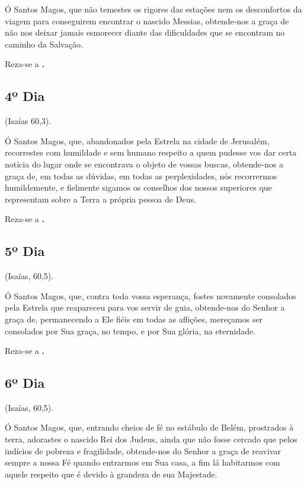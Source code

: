\documentclass[a4paper,14pt]{extarticle} \usepackage[utf8]{inputenc}
\begin{document}

Ó Santos Magos, que não temestes os rigores das estações nem os desconfortos da viagem para conseguirem encontrar o nascido Messias, obtende-nos a graça de não nos deixar jamais esmorecer diante das dificuldades que se encontram no caminho da Salvação.

Reza-se a \textbf{.}


\subsection{4º Dia}

 (Isaías 60,3).

Ó Santos Magos, que, abandonados pela Estrela na cidade de Jerusalém, recorrestes com humildade e sem humano respeito a quem pudesse vos dar certa notícia do lugar onde se encontrava o objeto de vossas buscas, obtende-nos a graça de, em todas as dúvidas, em todas as perplexidades, nós recorrermos humildemente, e fielmente sigamos os conselhos dos nossos superiores que representam sobre a Terra a própria pessoa de Deus. 

Reza-se a \textbf{.}


\subsection{5º Dia}

 (Isaías, 60,5).

Ó Santos Magos, que, contra toda vossa esperança, fostes novamente consolados pela Estrela que reapareceu para vos servir de guia, obtende-nos do Senhor a graça de, permanecendo a Ele fiéis em todas as aflições, mereçamos ser consolados por Sua graça, no tempo, e por Sua glória, na eternidade. 


Reza-se a \textbf{.}



\subsection{6º Dia}

 (Isaías, 60,5).

Ó Santos Magos, que, entrando cheios de fé no estábulo de Belém, prostrados à terra, adorastes o nascido Rei dos Judeus, ainda que não fosse cercado que pelos indícios de pobreza e fragilidade, obtende-nos do Senhor a graça de reavivar sempre a nossa Fé quando entrarmos em Sua casa, a fim lá habitarmos com aquele respeito que é devido à grandeza de sua Majestade. 
\end{document}
